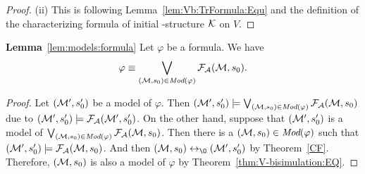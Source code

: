 \documentclass{article}
\begin{document}
\begin{proof}
(ii) This is following Lemma~\ref{lem:Vb:TrFormula:Equ} and the definition of the characterizing formula of initial \MPK-structure ${\cal K}$ on $V$.

\end{proof}


\textbf{Lemma}~\ref{lem:models:formula} Let $\varphi$ be a formula. We have
  \begin{equation}
    \varphi\equiv \bigvee_{({\cal M}, s_0)\in\textit{Mod}(\varphi)}{\cal F}_{\cal A}({\cal M}, s_0).
    \end{equation}
\begin{proof}
Let $({\cal M}', s_0')$ be a model of $\varphi$. Then $({\cal M}', s_0') \models \bigvee_{({\cal M}, s_0)\in \textit{Mod}(\varphi)} {\cal F}_{{\cal A}}({\cal M}, s_0)$ due to $({\cal M}', s_0') \models {\cal F}_{{\cal A}}({\cal M}', s_0')$. On the other hand, suppose that $({\cal M}', s_0')$ is a model of $\bigvee_{({\cal M}, s_0)\in \textit{Mod}(\varphi)} {\cal F}_{{\cal A}}({\cal M}, s_0)$. Then there is a $({\cal M}, s_0)\in \textit{Mod}(\varphi)$ such that $({\cal M}', s_0') \models {\cal F}_{{\cal A}}({\cal M}, s_0)$. And then $(\Hm, s_0) \lrto_{\O} (\Hm', s_0')$ by Theorem~\ref{CF}. Therefore, $({\cal M}, s_0)$ is also a model of $\varphi$ by Theorem~\ref{thm:V-bisimulation:EQ}.
\end{proof}

\end{document}
